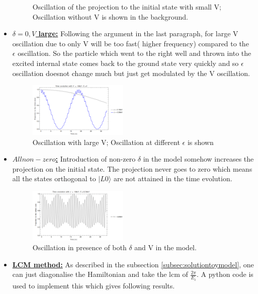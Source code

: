 \documentclass[a4paper,two column]{article}
\begin{document}
\begin{itemize}
\begin{figure}[H]
                \caption{Oscillation of the projection to the initial state with small V; Oscillation without V is shown in the background.}
                \label{fig:smallV}
            \end{figure}
            \item \underline{\textbf{$\delta=0,V $ large:}} Following the argument in the last paragraph, for large V oscillation due to only V will be too fast( higher frequency) compared to the $\epsilon$ oscillation. So the particle which went to the right well and thrown into the excited internal state comes back to the ground state very quickly and so $\epsilon$ oscillation doesnot change much but just get modulated by the V oscillation.
            \begin{figure}[H]
                \centering
                \includegraphics[width=0.45\textwidth,fbox]{image/twowell_epsilondel0V1}
                \caption{Oscillation with large V; Oscillation at different $\epsilon$ is shown}
                \label{fig:largeV}
            \end{figure}
            \item \underline{\textbf{$All non-zero$:}} Introduction of non-zero $\delta$ in the model somehow increases the projection on the initial state. The projection never goes to zero which means all the states orthogonal to $|L0\rangle$ are not attained in the time evolution. 
            \begin{figure}[H]
                \centering
                \includegraphics[width=0.45\textwidth,fbox]{image/twowell_epsilondelV}
                \caption{Oscillation in presence of both $\delta$ and V in the model.}
                \label{fig:allnonzero}
            \end{figure} 
            \item \underline{\textbf{LCM method:}} As described in the subsection \ref{subsec:solutiontoymodel}, one can just diagonalise the Hamiltonian and take the lcm of $\frac{2 \pi}{E_i}$. A python code is used to implement this which gives following results.

\end{itemize}
\end{document}
